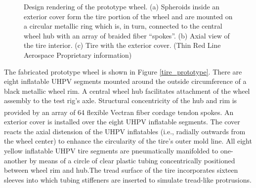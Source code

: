 \documentclass{article}
\begin{document}
\begin{figure}[hbt!]
\begin{minipage}{0.32\textwidth}
    \end{minipage}
        \begin{minipage}{0.32\textwidth}
        \centering
    \end{minipage}
    \caption{Design rendering of the prototype wheel. (a) Spheroids inside an exterior cover form the tire portion of the wheel and are mounted on a circular metallic ring which is, in turn, connected to the central wheel hub with an array of braided fiber “spokes”. (b) Axial view of the tire interior. (c) Tire with the exterior cover. (Thin Red Line Aerospace Proprietary information)}
    \label{tire_design}
\end{figure}

The fabricated prototype wheel is shown in Figure \ref{tire_prototype}. There are eight inflatable UHPV segments mounted around the outside circumference of a black metallic wheel rim. A central wheel hub facilitates attachment of the wheel assembly to the test rig's axle. Structural concentricity of the hub and rim is provided by an array of 64 flexible Vectran\textsuperscript{\textregistered} fiber cordage tendon spokes. An exterior cover is installed over the eight UHPV inflatable segments. The cover reacts the axial distension of the UHPV inflatables (i.e., radially outwards from the wheel center) to enhance the circularity of the tire's outer mold line. All eight yellow inflatable UHPV tire segments are pneumatically manifolded to one-another by means of a circle of clear plastic tubing concentrically positioned between wheel rim and hub.The tread surface of the tire incorporates sixteen sleeves into which tubing stiffeners are inserted to simulate tread-like protrusions. 
\end{document}
